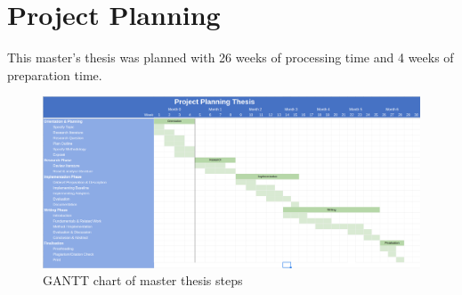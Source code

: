 \section{Project Planning}
This master's thesis was planned with 26 weeks of processing time and 4 weeks of preparation time.

\begin{figure}
    \centering
    \includegraphics[width=\textwidth]{./figures/project-planning.png}
    \caption{GANTT chart of master thesis steps}
\end{figure}

\pagebreak
